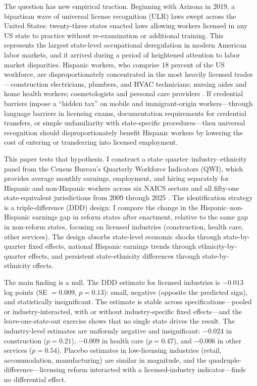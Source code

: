 \documentclass[12pt]{article}
\begin{document}
The question has new empirical traction. Beginning with Arizona in 2019, a bipartisan wave of universal license recognition (ULR) laws swept across the United States: twenty-three states enacted laws allowing workers licensed in any US state to practice without re-examination or additional training. This represents the largest state-level occupational deregulation in modern American labor markets, and it arrived during a period of heightened attention to labor market disparities. Hispanic workers, who comprise 18 percent of the US workforce, are disproportionately concentrated in the most heavily licensed trades---construction electricians, plumbers, and HVAC technicians; nursing aides and home health workers; cosmetologists and personal care providers \citep{redbird2017licensure}. If credential barriers impose a ``hidden tax'' on mobile and immigrant-origin workers---through language barriers in licensing exams, documentation requirements for credential transfers, or simple unfamiliarity with state-specific procedures---then universal recognition should disproportionately benefit Hispanic workers by lowering the cost of entering or transferring into licensed employment.

This paper tests that hypothesis. I construct a state--quarter--industry--ethnicity panel from the Census Bureau's Quarterly Workforce Indicators (QWI), which provides average monthly earnings, employment, and hiring separately for Hispanic and non-Hispanic workers across six NAICS sectors and all fifty-one state-equivalent jurisdictions from 2009 through 2025 \citep{abowd2009lehd}. The identification strategy is a triple-difference (DDD) design: I compare the change in the Hispanic--non-Hispanic earnings gap in reform states after enactment, relative to the same gap in non-reform states, focusing on licensed industries (construction, health care, other services). The design absorbs state-level economic shocks through state-by-quarter fixed effects, national Hispanic earnings trends through ethnicity-by-quarter effects, and persistent state-ethnicity differences through state-by-ethnicity effects.

The main finding is a null. The DDD estimate for licensed industries is $-0.013$ log points (SE $= 0.009$, $p = 0.13$): small, negative (opposite the predicted sign), and statistically insignificant. The estimate is stable across specifications---pooled or industry-interacted, with or without industry-specific fixed effects---and the leave-one-state-out exercise shows that no single state drives the result. The industry-level estimates are uniformly negative and insignificant: $-0.024$ in construction ($p = 0.21$), $-0.009$ in health care ($p = 0.47$), and $-0.006$ in other services ($p = 0.54$). Placebo estimates in low-licensing industries (retail, accommodation, manufacturing) are similar in magnitude, and the quadruple-difference---licensing reform interacted with a licensed-industry indicator---finds no differential effect.
\end{document}
